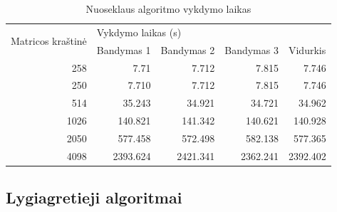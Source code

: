 \documentclass{VUMIFPSbakalaurinis}
\begin{document}
\begin{table}[]
    \begin{tabular}{|r|rrrr|}
        \hline
        \multicolumn{1}{|l|}{\multirow{2}{*}{Matricos kraštinė}} & \multicolumn{4}{l|}{Vykdymo laikas (s)}                                                                                                     \\ \cline{2-5}
        \multicolumn{1}{|l|}{}                                   & \multicolumn{1}{l|}{Bandymas 1}         & \multicolumn{1}{l|}{Bandymas 2} & \multicolumn{1}{l|}{Bandymas 3} & \multicolumn{1}{l|}{Vidurkis} \\ \hline        258                                                      & \multicolumn{1}{r|}{7.71}               & \multicolumn{1}{r|}{7.712}                     & \multicolumn{1}{r|}{7.815}      & 7.746                         \\ \hline
        250                                                      & \multicolumn{1}{r|}{7.710}              & \multicolumn{1}{r|}{7.712}      & \multicolumn{1}{r|}{7.815}      & 7.746                         \\ \hline
        514                                                      & \multicolumn{1}{r|}{35.243}             & \multicolumn{1}{r|}{34.921}     & \multicolumn{1}{r|}{34.721}     & 34.962                        \\ \hline
        1026                                                     & \multicolumn{1}{r|}{140.821}            & \multicolumn{1}{r|}{141.342}    & \multicolumn{1}{r|}{140.621}    & 140.928                       \\ \hline
        2050                                                     & \multicolumn{1}{r|}{577.458}            & \multicolumn{1}{r|}{572.498}    & \multicolumn{1}{r|}{582.138}    & 577.365                       \\ \hline
        4098                                                     & \multicolumn{1}{r|}{2393.624}           & \multicolumn{1}{r|}{2421.341}   & \multicolumn{1}{r|}{2362.241}   & 2392.402                      \\ \hline
    \end{tabular}
    \caption{Nuoseklaus algoritmo vykdymo laikas}
    \label{table:seq_time}
\end{table}


\subsection{Lygiagretieji algoritmai}
\end{document}

